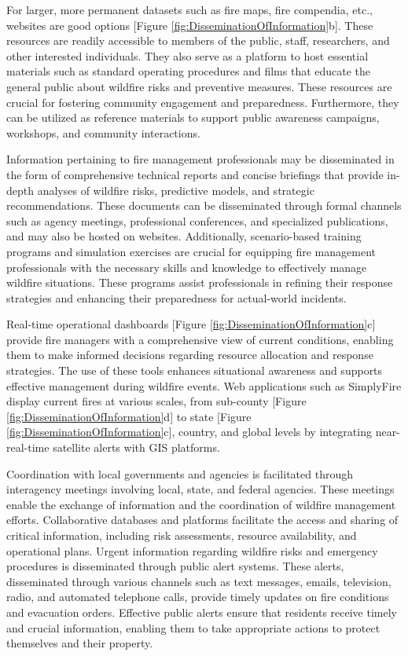 \documentclass[
  12 pt,
]{Nemilov}
\begin{document}
For larger, more permanent datasets such as fire maps, fire compendia, etc., websites are good options {[}Figure \ref{fig:DisseminationOfInformation}b{]}. These resources are readily accessible to members of the public, staff, researchers, and other interested individuals. They also serve as a platform to host essential materials such as standard operating procedures and films that educate the general public about wildfire risks and preventive measures. These resources are crucial for fostering community engagement and preparedness. Furthermore, they can be utilized as reference materials to support public awareness campaigns, workshops, and community interactions.

Information pertaining to fire management professionals may be disseminated in the form of comprehensive technical reports and concise briefings that provide in-depth analyses of wildfire risks, predictive models, and strategic recommendations. These documents can be disseminated through formal channels such as agency meetings, professional conferences, and specialized publications, and may also be hosted on websites. Additionally, scenario-based training programs and simulation exercises are crucial for equipping fire management professionals with the necessary skills and knowledge to effectively manage wildfire situations. These programs assist professionals in refining their response strategies and enhancing their preparedness for actual-world incidents.

Real-time operational dashboards {[}Figure \ref{fig:DisseminationOfInformation}c{]} provide fire managers with a comprehensive view of current conditions, enabling them to make informed decisions regarding resource allocation and response strategies. The use of these tools enhances situational awareness and supports effective management during wildfire events. Web applications such as SimplyFire display current fires at various scales, from sub-county {[}Figure \ref{fig:DisseminationOfInformation}d{]} to state {[}Figure \ref{fig:DisseminationOfInformation}c{]}, country, and global levels by integrating near-real-time satellite alerts with GIS platforms.

Coordination with local governments and agencies is facilitated through interagency meetings involving local, state, and federal agencies. These meetings enable the exchange of information and the coordination of wildfire management efforts. Collaborative databases and platforms facilitate the access and sharing of critical information, including risk assessments, resource availability, and operational plans. Urgent information regarding wildfire risks and emergency procedures is disseminated through public alert systems. These alerts, disseminated through various channels such as text messages, emails, television, radio, and automated telephone calls, provide timely updates on fire conditions and evacuation orders. Effective public alerts ensure that residents receive timely and crucial information, enabling them to take appropriate actions to protect themselves and their property.
\end{document}

